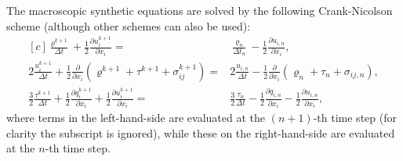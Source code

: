 \documentclass[onefignum,onetabnum]{siamart171218}
\begin{document}
The macroscopic synthetic equations are solved by the following Crank-Nicolson scheme (although other schemes can also be used):
\begin{equation}\label{eq123_lin_time_dependent}
\begin{aligned}[c]
\frac{\varrho^{k+1}}{\Delta{t}}
+\frac{1}{2}\frac{\partial {u^{k+1}_i}}{\partial{x_i}}=&\frac{\varrho_n}{\Delta{}t_n}
-\frac{1}{2}\frac{\partial {u_{i,n}}}{\partial{x_i}},\\
2\frac{u_i^{k+1}}{\Delta{t}}
+\frac{1}{2}\frac{\partial }{\partial{x_i}}
\left(
\varrho^{k+1}+ {\tau^{k+1}}+\sigma^{k+1}_{ij}\right)
=&
2\frac{u_{i,n}}{\Delta{t}}
-\frac{1}{2}\frac{\partial }{\partial{x_i}}\left(
{\varrho_n}+\tau_n+\sigma_{ij,n}\right), \\
\frac{3}{2}\frac{\tau^{k+1}}{\Delta{t}}
+\frac{1}{2}\frac{\partial {{q^{k+1}_{i}}}}{\partial{x_i}}
+\frac{1}{2}\frac{\partial {{u^{k+1}_{i}}}}{\partial{x_i}}=
&\frac{3}{2}\frac{\tau_n}{\Delta{t}}
-\frac{1}{2}\frac{\partial {q_{i,n}}}{\partial{x_i}}
-\frac{1}{2}\frac{\partial {u_{i,n}}}{\partial{x_i}},	
\end{aligned}
\end{equation}
where terms in the left-hand-side are evaluated at the $(n+1)$-th time step (for clarity the subscript is ignored), while these on the right-hand-side are evaluated at the $n$-th time step.



\end{document}
